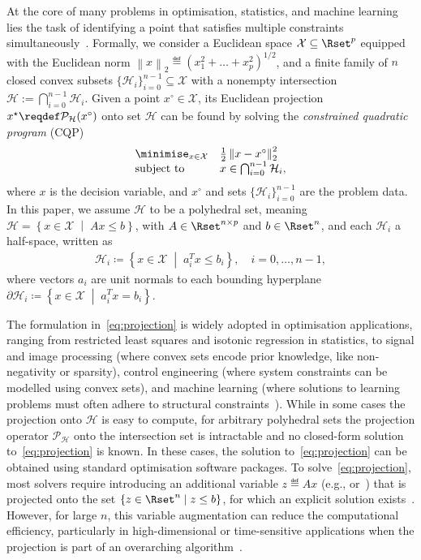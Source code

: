 \documentclass[onecolumn]{autart}
\newcommand{\twonorm}[1]{\left\| #1 \right\|_2}
\newcommand{\set}[2]{\left\{ #1 \;\middle|\; #2 \right\}}
\begin{document}
At the core of many problems in optimisation, statistics, and machine learning lies the task of identifying a point that satisfies multiple constraints simultaneously~\cite[Ch. 8]{BOYDCONVEX}. Formally, we consider a Euclidean space $\mathcal{X} \subseteq \Rset^p$ equipped with the Euclidean norm $\twonorm{x}\eqdef (x_1^2+\dots+x_p^2)^{1/2}$, and a finite family of $n$ closed convex subsets $\{\mathcal{H}_i\}_{i=0}^{n-1}\subseteq\mathcal{X}$ with a nonempty intersection $\mathcal{H} := \bigcap_{i=0}^{n-1} \mathcal{H}_i$. Given a point $x^\circ \in \mathcal{X}$, its Euclidean projection $x^\star \reqdef \mathcal{P}_{\mathcal{H}}(x^\circ)$ onto set $\mathcal{H}$ can be found by solving the \textit{constrained quadratic program} (CQP)
\begin{equation} \label{eq:projection}
\begin{array}{ll}
    {\displaystyle \minimise_{x\in\mathcal{X}}}  & \frac{1}{2}\twonorm{x-x^\circ}^2 \\
    \text{subject to} & x \in \bigcap_{i=0}^{n-1}\mathcal{H}_i,
\end{array}
\end{equation}
where $x$ is the decision variable, and $x^\circ$ and sets $\{\mathcal{H}_i\}_{i=0}^{n-1}$ are the problem data. In this paper, we assume $\mathcal{H}$ to be a polyhedral set, meaning $\mathcal{H}=\set{x \in \mathcal{X}}{A x \leq b}$, with $A \in \Rset^{n\times p}$ and $b \in \Rset^n$, and each $\mathcal{H}_i$ a half-space, written as
\begin{align}\label{eq:sets_i}
\mathcal{H}_i\coloneqq\set{x\in\mathcal{X}}{a_i^Tx \leq b_i}, \quad i=0,\dots,n-1,
\end{align}
where vectors $a_i$ are unit normals to each bounding hyperplane $\partial\mathcal{H}_i\coloneqq\set{x\in\mathcal{X}}{a_i^Tx = b_i}$.

The formulation in~\eqref{eq:projection} is widely adopted in optimisation applications, ranging from restricted least squares and isotonic regression in statistics, to signal and image processing (where convex sets encode prior knowledge, like non-negativity or sparsity), control engineering (where system constraints can be modelled using convex sets), and machine learning (where solutions to learning problems must often adhere to structural constraints~\cite{BAUSCHKESWISS}). While in some cases the projection onto $\mathcal{H}$ is easy to compute, for arbitrary polyhedral sets the projection operator $\mathcal{P}_{\mathcal{H}}$ onto the intersection set is intractable and no closed-form solution to~\eqref{eq:projection} is known. In these cases, the solution to~\eqref{eq:projection} can be obtained using standard optimisation software packages. To solve~\eqref{eq:projection}, most solvers require introducing an additional variable $z\eqdef Ax$ (e.g., \cite{osqp} or~\cite{ocpb:16}) that is projected onto the set $\set{z\in\Rset^n}{z \leq b}$, for which an explicit solution exists~\cite{BOYDCONVEX}. However, for large $n$, this variable augmentation can reduce the computational efficiency, particularly in high-dimensional or time-sensitive applications when the projection is part of an overarching algorithm~\cite{OPTIMNESTEROV,KEMPF20206542}.
\end{document}
